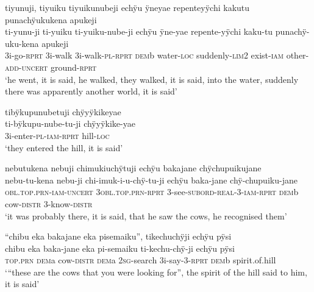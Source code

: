 \ea%
\begingl 
\glpreamble tiyunuji, tiyuiku tiyuikunubeji echÿu ÿneyae repenteyÿchi kakutu punachÿukukena apukeji\\
\gla ti-yunu-ji ti-yuiku ti-yuiku-nube-ji echÿu ÿne-yae repente-yÿchi kaku-tu punachÿ-uku-kena apukeji\\ 
\glb 3i-go-\textsc{rprt} 3i-walk 3i-walk-\textsc{pl}-\textsc{rprt} \textsc{dem}b water-\textsc{loc} suddenly-\textsc{lim}2 exist-\textsc{iam} other-\textsc{add}-\textsc{uncert} ground-\textsc{rprt}\\ 
\glft ‘he went, it is said, he walked, they walked, it is said, into the water, suddenly there was apparently another world, it is said’\\ 
\endgl
\xe

\ea%
\begingl 
\glpreamble tibÿkupunubetuji chÿyÿkikeyae\\
\gla ti-bÿkupu-nube-tu-ji chÿyÿkike-yae\\ 
\glb 3i-enter-\textsc{pl}-\textsc{iam}-\textsc{rprt} hill-\textsc{loc}\\ 
\glft ‘they entered the hill, it is said’\\ 
\endgl
\xe

\ea%
\begingl 
\glpreamble nebutukena nebuji chimukiuchÿtuji echÿu bakajane chÿchupuikujane\\
\gla nebu-tu-kena nebu-ji chi-imuk-i-u-chÿ-tu-ji echÿu baka-jane chÿ-chupuiku-jane\\ 
\textsc{obl.top.prn}-\textsc{iam}-\textsc{uncert} 3\textsc{obl.top.prn}-\textsc{rprt} 3-see-\textsc{subord}-\textsc{real}-3-\textsc{iam}-\textsc{rprt} \textsc{dem}b cow-\textsc{distr} 3-know-\textsc{distr}\\ 
\glft ‘it was probably there, it is said, that he saw the cows, he recognised them’\\ 
\endgl
\xe

\ea%
\begingl
\glpreamble “chibu eka bakajane eka pisemaiku”, tikechuchÿji echÿu pÿsi\\
\gla chibu eka baka-jane eka pi-semaiku ti-kechu-chÿ-ji echÿu pÿsi\\
\textsc{top.prn} \textsc{dem}a cow-\textsc{distr} \textsc{dem}a 2\textsc{sg}-search 3i-say-3-\textsc{rprt} \textsc{dem}b spirit.of.hill\\
\glft ‘“these are the cows that you were looking for”, the spirit of the hill said to him, it is said’
\endgl
\xe

